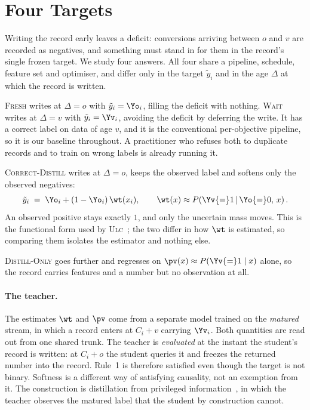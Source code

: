 \section{Four Targets}
\label{sec:targets}

Writing the record early leaves a deficit: conversions arriving between $o$ and $v$ are recorded
as negatives, and something must stand in for them in the record's single frozen target. We
study four answers. All four share a pipeline, schedule, feature set and optimiser, and differ
only in the target $\tilde y_i$ and in the age $\Delta$ at which the record is written.

\textsc{Fresh} writes at $\Delta=o$ with $\tilde y_i=\Yo_i$, filling the deficit with nothing.
\textsc{Wait} writes at $\Delta=v$ with $\tilde y_i=\Yv_i$, avoiding the deficit by deferring the
write. It has a correct label on data of age $v$, and it is the conventional per-objective
pipeline, so it is our baseline throughout. A practitioner who refuses both to duplicate records
and to train on wrong labels is already running it.

\textsc{Correct-Distill} writes at $\Delta=o$, keeps the observed label and softens only the
observed negatives:
\begin{equation}
  \tilde y_i \;=\; \Yo_i + (1-\Yo_i)\,\wt(x_i),
  \qquad
  \wt(x) \approx P\!\left(\Yv{=}1 \,\middle|\, \Yo{=}0,\, x\right).
  \label{eq:hybrid}
\end{equation}
An observed positive stays exactly $1$, and only the uncertain mass moves. This is the
functional form used by \textsc{Ulc}~\cite{wang2023unbiased}; the two differ in how $\wt$ is
estimated, so comparing them isolates the estimator and nothing else.

\textsc{Distill-Only} goes further and regresses on $\pv(x)\approx P(\Yv{=}1\mid x)$ alone, so
the record carries features and a number but no observation at all.

\paragraph{The teacher.}
The estimates $\wt$ and $\pv$ come from a separate model trained on the \emph{matured} stream,
in which a record enters at $C_i+v$ carrying $\Yv_i$. Both quantities are read out from one
shared trunk. The teacher is \emph{evaluated} at the instant the student's record is written:
at $C_i+o$ the student queries it and freezes the returned number into the record. Rule~1 is
therefore satisfied even though the target is not binary. Softness is a different way of
satisfying causality, not an exemption from it. The construction is distillation from privileged
information~\cite{xu2019privileged}, in which the teacher observes the matured label that the
student by construction cannot.

